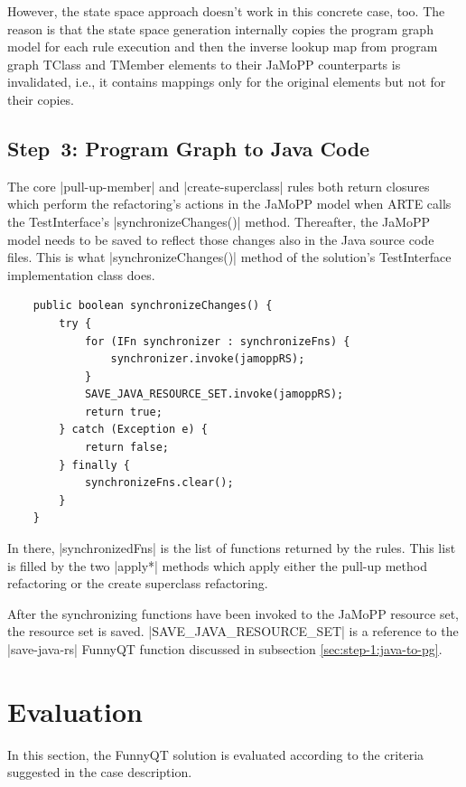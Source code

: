 \documentclass[submission]{eptcs}
\newcommand{\code}{\clojureinline}
\begin{document}
However, the state space approach doesn't work in this concrete case, too.  The
reason is that the state space generation internally copies the program graph
model for each rule execution and then the inverse lookup map from program
graph \textsf{TClass} and \textsf{TMember} elements to their JaMoPP
counterparts is invalidated, i.e., it contains mappings only for the original
elements but not for their copies.


\subsection{Step~3: Program Graph to Java Code}
\label{sec:step-3:pg-to-java}

The core \code|pull-up-member| and \code|create-superclass| rules both return
closures which perform the refactoring's actions in the JaMoPP model when ARTE
calls the \textsf{TestInterface}'s \code|synchronizeChanges()| method.
Thereafter, the JaMoPP model needs to be saved to reflect those changes also in
the Java source code files.  This is what \code|synchronizeChanges()| method of
the solution's \textsf{TestInterface} implementation class does.

\begin{verbatim}
    public boolean synchronizeChanges() {
        try {
            for (IFn synchronizer : synchronizeFns) {
                synchronizer.invoke(jamoppRS);
            }
            SAVE_JAVA_RESOURCE_SET.invoke(jamoppRS);
            return true;
        } catch (Exception e) {
            return false;
        } finally {
            synchronizeFns.clear();
        }
    }
\end{verbatim}

In there, \code|synchronizedFns| is the list of functions returned by the
rules.  This list is filled by the two \code|apply*| methods which apply either
the pull-up method refactoring or the create superclass refactoring.

After the synchronizing functions have been invoked to the JaMoPP resource set,
the resource set is saved.  \code|SAVE_JAVA_RESOURCE_SET| is a reference to the
\code|save-java-rs| FunnyQT function discussed in subsection
\vref{sec:step-1:java-to-pg}.


\section{Evaluation}
\label{sec:evaluation}

In this section, the FunnyQT solution is evaluated according to the criteria
suggested in the case description.
\end{document}
